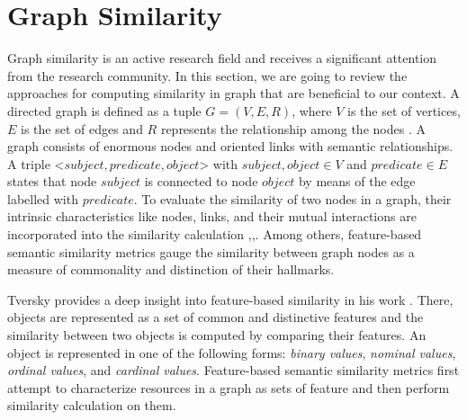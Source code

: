 \section{Graph Similarity} \label{sec:GraphSimilarity}
Graph similarity is an active research field and receives a significant attention from the research community. In this section, we are going to review the approaches for computing similarity in graph that are beneficial to our context. A directed graph is defined as a tuple $G=(V,E,R)$, where $V$ is the set of vertices, $E$ is the set of edges and $R$ represents the relationship among the nodes \cite{bizer_linked_2009}. A graph consists of enormous nodes and oriented links with semantic relationships. A triple <$subject, predicate, object$> with $subject, object \in V$ and $predicate \in E$ states that node $subject$ is connected to node $object$ by means of the edge labelled with $predicate$. To evaluate the similarity of two nodes in a graph, their intrinsic characteristics like nodes, links, and their mutual interactions are incorporated into the similarity calculation \cite{DiNoia:2012:LOD:2362499.2362501},\cite{Nguyen:2015:CRV:2942298.2942305},\cite{Nguyen:2015:ESP:2740908.2742141}. Among others, feature-based semantic similarity metrics gauge the similarity between graph nodes as a measure of commonality and distinction of their hallmarks.

Tversky provides a deep insight into feature-based similarity in his work \cite{tversky1977features}. There, objects are represented as a set of common and distinctive features and the similarity between two objects is computed by comparing their features. An object is represented in one of the following forms: \emph{binary values}, \emph{nominal values}, \emph{ordinal values}, and \emph{cardinal values}. Feature-based semantic similarity metrics first attempt to characterize resources in a graph as sets of feature and then perform similarity calculation on them.




